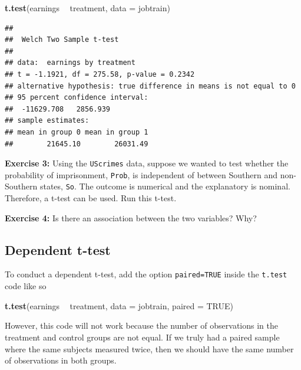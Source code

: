 \documentclass[
]{book}
\newenvironment{Shaded}{\begin{snugshade}}{\end{snugshade}}
\newcommand{\DataTypeTok}[1]{\textcolor[rgb]{0.13,0.29,0.53}{#1}}
\newcommand{\KeywordTok}[1]{\textcolor[rgb]{0.13,0.29,0.53}{\textbf{#1}}}
\newcommand{\NormalTok}[1]{#1}
\newcommand{\OperatorTok}[1]{\textcolor[rgb]{0.81,0.36,0.00}{\textbf{#1}}}
\newcommand{\OtherTok}[1]{\textcolor[rgb]{0.56,0.35,0.01}{#1}}
\newcommand{\StringTok}[1]{\textcolor[rgb]{0.31,0.60,0.02}{#1}}
\newenvironment{learncheck}%
{%
  \par\vspace{\baselineskip}\noindent 
  \color{Exercise}\begin{itshape}%
  \par\vspace{\baselineskip}\noindent\ignorespaces 
}%
{%
  \end{itshape}\ignorespacesafterend 
}
\begin{document}
\begin{Shaded}
\begin{Highlighting}[]
\KeywordTok{t.test}\NormalTok{(earnings }\OperatorTok{~}\StringTok{ }\NormalTok{treatment, }\DataTypeTok{data =}\NormalTok{ jobtrain)}
\end{Highlighting}
\end{Shaded}

\begin{verbatim}
## 
## 	Welch Two Sample t-test
## 
## data:  earnings by treatment
## t = -1.1921, df = 275.58, p-value = 0.2342
## alternative hypothesis: true difference in means is not equal to 0
## 95 percent confidence interval:
##  -11629.708   2856.939
## sample estimates:
## mean in group 0 mean in group 1 
##        21645.10        26031.49
\end{verbatim}

\begin{learncheck}
\textbf{Exercise 3:} Using the \texttt{UScrimes} data, suppose we wanted
to test whether the probability of imprisonment, \texttt{Prob}, is
independent of between Southern and non-Southern states, \texttt{So}.
The outcome is numerical and the explanatory is nominal. Therefore, a
t-test can be used. Run this t-test.
\end{learncheck}

\begin{learncheck}
\textbf{Exercise 4:} Is there an association between the two variables?
Why?
\end{learncheck}

\hypertarget{dependent-t-test}{%
\subsection{Dependent t-test}\label{dependent-t-test}}

To conduct a dependent t-test, add the option \texttt{paired=TRUE} inside the \texttt{t.test} code like so

\begin{Shaded}
\begin{Highlighting}[]
\KeywordTok{t.test}\NormalTok{(earnings }\OperatorTok{~}\StringTok{ }\NormalTok{treatment, }\DataTypeTok{data =}\NormalTok{ jobtrain, }\DataTypeTok{paired =} \OtherTok{TRUE}\NormalTok{)}
\end{Highlighting}
\end{Shaded}

However, this code will not work because the number of observations in the treatment and control groups are not equal. If we truly had a paired sample where the same subjects measured twice, then we should have the same number of observations in both groups.
\end{document}
